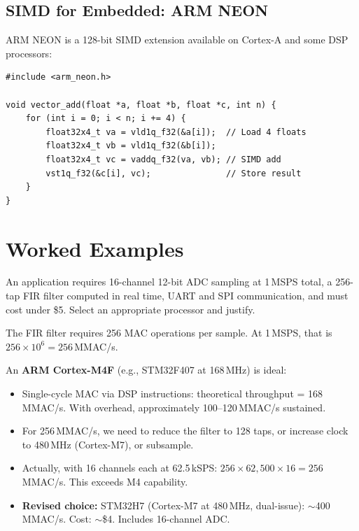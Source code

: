 \subsection{SIMD for Embedded: ARM NEON}

ARM NEON is a 128-bit SIMD extension available on Cortex-A and some DSP processors:

\begin{lstlisting}[style=C, caption={NEON intrinsics example: vector addition of four 32-bit floats.}]
#include <arm_neon.h>

void vector_add(float *a, float *b, float *c, int n) {
    for (int i = 0; i < n; i += 4) {
        float32x4_t va = vld1q_f32(&a[i]);  // Load 4 floats
        float32x4_t vb = vld1q_f32(&b[i]);
        float32x4_t vc = vaddq_f32(va, vb); // SIMD add
        vst1q_f32(&c[i], vc);               // Store result
    }
}
\end{lstlisting}

\section{Worked Examples}
\label{sec:proc:examples}

\begin{example}
An application requires 16-channel 12-bit ADC sampling at 1\,MSPS total, a 256-tap FIR filter computed in real time, UART and SPI communication, and must cost under \$5. Select an appropriate processor and justify.

\begin{solution}
The FIR filter requires 256 MAC operations per sample. At 1\,MSPS, that is $256 \times 10^6 = 256\,$MMAC/s.

An \textbf{ARM Cortex-M4F} (e.g., STM32F407 at 168\,MHz) is ideal:
\begin{itemize}[nosep]
  \item Single-cycle MAC via DSP instructions: theoretical throughput = 168\,MMAC/s. With overhead, approximately 100--120\,MMAC/s sustained.
  \item For 256\,MMAC/s, we need to reduce the filter to 128 taps, or increase clock to 480\,MHz (Cortex-M7), or subsample.
  \item Actually, with 16 channels each at 62.5\,kSPS: $256 \times 62{,}500 \times 16 = 256\,$MMAC/s. This exceeds M4 capability.
  \item \textbf{Revised choice:} STM32H7 (Cortex-M7 at 480\,MHz, dual-issue): $\sim$400\,MMAC/s. Cost: $\sim$\$4. Includes 16-channel ADC.
\end{itemize}
\end{solution}
\end{example}

